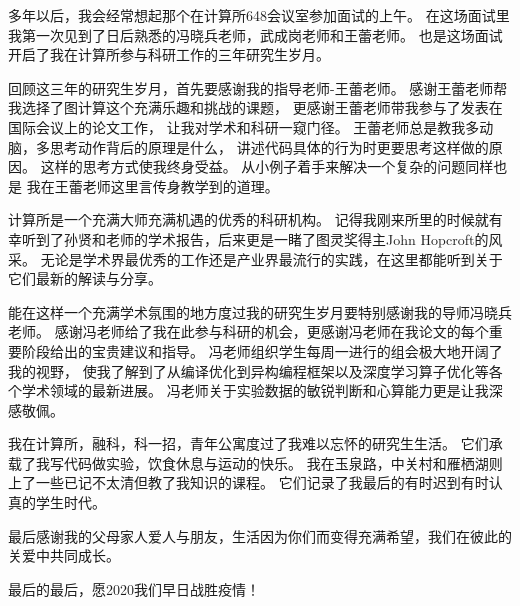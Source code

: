 多年以后，我会经常想起那个在计算所648会议室参加面试的上午。
在这场面试里我第一次见到了日后熟悉的冯晓兵老师，武成岗老师和王蕾老师。
也是这场面试开启了我在计算所参与科研工作的三年研究生岁月。

回顾这三年的研究生岁月，首先要感谢我的指导老师-王蕾老师。
感谢王蕾老师帮我选择了图计算这个充满乐趣和挑战的课题，
更感谢王蕾老师带我参与了发表在国际会议上的论文工作，
让我对学术和科研一窥门径。
王蕾老师总是教我多动脑，多思考动作背后的原理是什么，
讲述代码具体的行为时更要思考这样做的原因。
这样的思考方式使我终身受益。
从小例子着手来解决一个复杂的问题同样也是
我在王蕾老师这里言传身教学到的道理。

计算所是一个充满大师充满机遇的优秀的科研机构。
记得我刚来所里的时候就有幸听到了孙贤和老师的学术报告，后来更是一睹了图灵奖得主John Hopcroft的风采。
无论是学术界最优秀的工作还是产业界最流行的实践，在这里都能听到关于它们最新的解读与分享。

能在这样一个充满学术氛围的地方度过我的研究生岁月要特别感谢我的导师冯晓兵老师。
感谢冯老师给了我在此参与科研的机会，更感谢冯老师在我论文的每个重要阶段给出的宝贵建议和指导。
冯老师组织学生每周一进行的组会极大地开阔了我的视野，
使我了解到了从编译优化到异构编程框架以及深度学习算子优化等各个学术领域的最新进展。
冯老师关于实验数据的敏锐判断和心算能力更是让我深感敬佩。

我在计算所，融科，科一招，青年公寓度过了我难以忘怀的研究生生活。
它们承载了我写代码做实验，饮食休息与运动的快乐。
我在玉泉路，中关村和雁栖湖则上了一些已记不太清但教了我知识的课程。
它们记录了我最后的有时迟到有时认真的学生时代。

最后感谢我的父母家人爱人与朋友，生活因为你们而变得充满希望，我们在彼此的关爱中共同成长。

最后的最后，愿2020我们早日战胜疫情！


\cleardoublepage[plain]%
